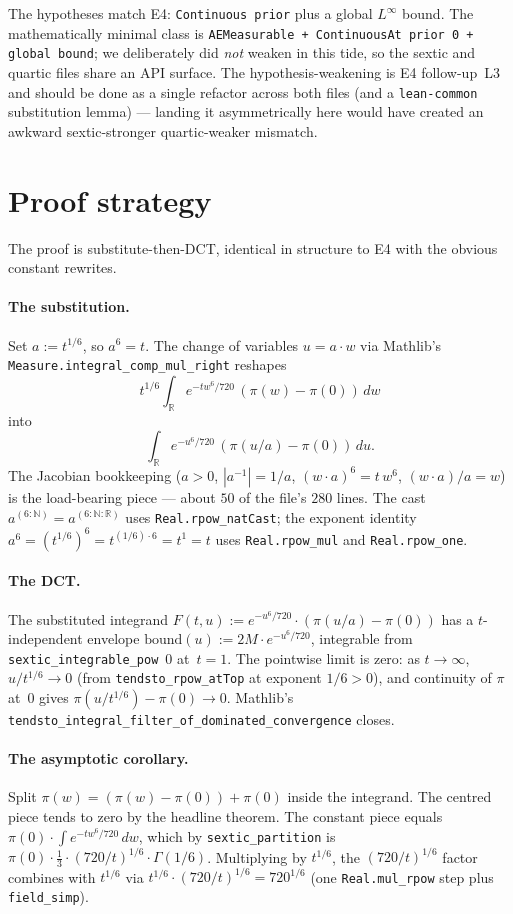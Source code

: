 \documentclass[11pt]{article}
\begin{document}
The hypotheses match E4: \texttt{Continuous prior} plus a global
$L^\infty$ bound. The mathematically minimal class is
\texttt{AEMeasurable + ContinuousAt prior 0 + global bound}; we
deliberately did \emph{not} weaken in this tide, so the sextic and
quartic files share an API surface. The hypothesis-weakening is E4
follow-up~L3 and should be done as a single refactor across both
files (and a \texttt{lean-common} substitution lemma) — landing it
asymmetrically here would have created an awkward sextic-stronger
quartic-weaker mismatch.

\section{Proof strategy}

The proof is substitute-then-DCT, identical in structure to E4 with
the obvious constant rewrites.

\paragraph{The substitution.} Set $a := t^{1/6}$, so $a^6 = t$. The
change of variables $u = a\cdot w$ via Mathlib's
\texttt{Measure.integral\_comp\_mul\_right} reshapes
\[
  t^{1/6} \int_{\mathbb R} e^{-t w^6/720}\,(\pi(w) - \pi(0))\,dw
\]
into
\[
  \int_{\mathbb R} e^{-u^6/720}\,(\pi(u/a) - \pi(0))\,du.
\]
The Jacobian bookkeeping ($a > 0$, $|a^{-1}| = 1/a$,
$(w\cdot a)^6 = t\, w^6$, $(w\cdot a)/a = w$) is the load-bearing
piece — about $50$ of the file's $280$ lines. The cast
$a^{(6:\mathbb N)} = a^{(6:\mathbb N : \mathbb R)}$ uses
\texttt{Real.rpow\_natCast}; the exponent identity
$a^6 = (t^{1/6})^6 = t^{(1/6)\cdot 6} = t^1 = t$ uses
\texttt{Real.rpow\_mul} and \texttt{Real.rpow\_one}.

\paragraph{The DCT.} The substituted integrand
$F(t,u) := e^{-u^6/720}\cdot (\pi(u/a) - \pi(0))$ has a
$t$-independent envelope $\mathrm{bound}(u) := 2M\cdot e^{-u^6/720}$,
integrable from \texttt{sextic\_integrable\_pow}~$0$ at~$t=1$. The
pointwise limit is zero: as $t \to \infty$,
$u/t^{1/6} \to 0$ (from \texttt{tendsto\_rpow\_atTop} at exponent
$1/6 > 0$), and continuity of $\pi$ at~$0$ gives
$\pi(u/t^{1/6}) - \pi(0) \to 0$. Mathlib's
\texttt{tendsto\_integral\_filter\_of\_dominated\_convergence}
closes.

\paragraph{The asymptotic corollary.} Split
$\pi(w) = (\pi(w) - \pi(0)) + \pi(0)$ inside the integrand. The
centred piece tends to zero by the headline theorem. The constant
piece equals $\pi(0)\cdot \int e^{-tw^6/720}\,dw$, which by
\texttt{sextic\_partition} is $\pi(0)\cdot \tfrac13 \cdot
(720/t)^{1/6}\cdot\Gamma(1/6)$. Multiplying by $t^{1/6}$, the
$(720/t)^{1/6}$ factor combines with $t^{1/6}$ via
$t^{1/6}\cdot (720/t)^{1/6} = 720^{1/6}$ (one
\texttt{Real.mul\_rpow} step plus \texttt{field\_simp}).
\end{document}
